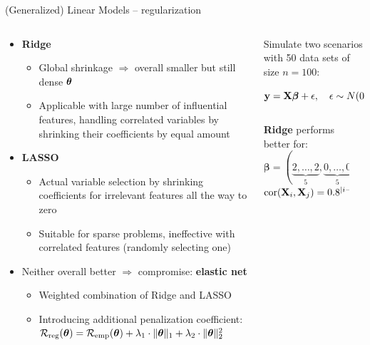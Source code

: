 \begin{frame}{(Generalized) Linear Models -- regularization}

  \begin{columns}[T, totalwidth=\textwidth]
  \begin{column}{0.62\textwidth}

\medskip



\begin{itemize}
  \item \textbf{Ridge}
  \begin{itemize} 
    \item Global shrinkage $\Rightarrow$ overall smaller but still dense $\bm{\theta}$
    \item Applicable with large number of influential features, handling 
    correlated variables by shrinking their coefficients by equal amount
  \end{itemize}
  \item \textbf{LASSO}
  \begin{itemize} 
    \item Actual variable selection by shrinking coefficients for irrelevant 
    features all the way to zero
    \item Suitable for sparse problems, ineffective with correlated 
    features (randomly selecting one)
  \end{itemize}  
  \item Neither overall better $\Rightarrow$ compromise: \textbf{elastic net}
  \begin{itemize} 
    \item Weighted combination of Ridge and LASSO
    \item Introducing additional penalization coefficient: $\mathcal{R}_{\text{reg}}(\bm{\theta}) = \mathcal{R}_{\text{emp}}(\bm{\theta}) 
    + \lambda_1 \cdot \|\bm{\theta}\|_1 + \lambda_2 \cdot \|\bm{\theta}\|_2^2$
  \end{itemize}  
\end{itemize}

\end{column}

\begin{column}{0.38\textwidth}
\tiny
\centering
Simulate two scenarios with 50 data sets of size $n = 100$: 

$\mathbf{y} =\mathbf{X} \boldsymbol{\beta}+ \epsilon, \quad \epsilon \sim N(0,1)$
\begin{columns}[T, totalwidth=\textwidth]
\begin{column}{0.5\textwidth}
\tiny
\begin{center}
\textbf{Ridge} performs better for: \\ 
$\boldsymbol{\beta}=(\underbrace{2,\ldots,2}_{5},\underbrace{0,\ldots,0}_{5})$\\
$ \operatorname{cor}(\mathbf{X}_{i},\mathbf{X}_{j})=0.8^{|i-j|}, \forall i, j$
  \end{center}
\end{column}
\begin{column}{0.5\textwidth} \tiny


\end{column}
\end{columns}
\end{column}
\end{columns}
\end{frame}
